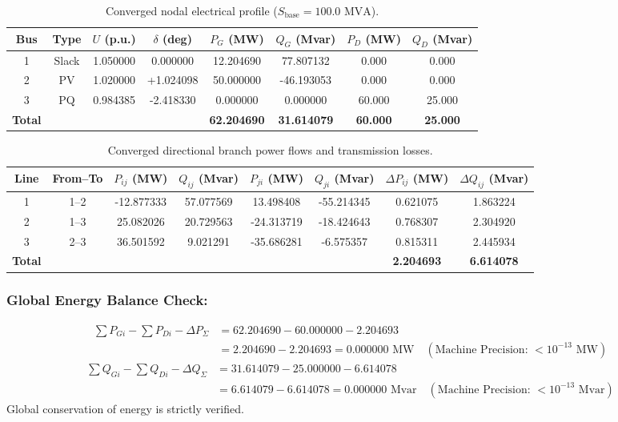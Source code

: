 \documentclass[12pt,a4paper,oneside]{report}
\begin{document}
\begin{table}[H]
\centering
\caption{Converged nodal electrical profile ($S_{\text{base}} = 100.0\text{ MVA}$).}
\label{tab:converged_bus}
\begin{tabular}{cccccccc}
\toprule
\textbf{Bus} & \textbf{Type} & \textbf{$U$ (p.u.)} & \textbf{$\delta$ (deg)} & \textbf{$P_G$ (MW)} & \textbf{$Q_G$ (Mvar)} & \textbf{$P_D$ (MW)} & \textbf{$Q_D$ (Mvar)} \\
\midrule
1 & Slack & 1.050000 & 0.000000 & 12.204690 & 77.807132 & 0.000 & 0.000 \\
2 & PV & 1.020000 & +1.024098 & 50.000000 & -46.193053 & 0.000 & 0.000 \\
3 & PQ & 0.984385 & -2.418330 & 0.000000 & 0.000000 & 60.000 & 25.000 \\
\midrule
\textbf{Total} & & & & \textbf{62.204690} & \textbf{31.614079} & \textbf{60.000} & \textbf{25.000} \\
\bottomrule
\end{tabular}
\end{table}

\begin{table}[H]
\centering
\caption{Converged directional branch power flows and transmission losses.}
\label{tab:converged_branch}
\begin{tabular}{cccccccc}
\toprule
\textbf{Line} & \textbf{From--To} & \textbf{$P_{ij}$ (MW)} & \textbf{$Q_{ij}$ (Mvar)} & \textbf{$P_{ji}$ (MW)} & \textbf{$Q_{ji}$ (Mvar)} & \textbf{$\Delta P_{ij}$ (MW)} & \textbf{$\Delta Q_{ij}$ (Mvar)} \\
\midrule
1 & 1--2 & -12.877333 & 57.077569 & 13.498408 & -55.214345 & 0.621075 & 1.863224 \\
2 & 1--3 & 25.082026 & 20.729563 & -24.313719 & -18.424643 & 0.768307 & 2.304920 \\
3 & 2--3 & 36.501592 & 9.021291 & -35.686281 & -6.575357 & 0.815311 & 2.445934 \\
\midrule
\textbf{Total} & & & & & & \textbf{2.204693} & \textbf{6.614078} \\
\bottomrule
\end{tabular}
\end{table}

\subsubsection{Global Energy Balance Check:}
\begin{align}
\sum P_{Gi} - \sum P_{Di} - \Delta P_{\Sigma} &= 62.204690 - 60.000000 - 2.204693 \nonumber \\
&= 2.204690 - 2.204693 = 0.000000\text{ MW} \quad (\text{Machine Precision: } < 10^{-13}\text{ MW})
\end{align}
\begin{align}
\sum Q_{Gi} - \sum Q_{Di} - \Delta Q_{\Sigma} &= 31.614079 - 25.000000 - 6.614078 \nonumber \\
&= 6.614079 - 6.614078 = 0.000000\text{ Mvar} \quad (\text{Machine Precision: } < 10^{-13}\text{ Mvar})
\end{align}
Global conservation of energy is strictly verified.
\end{document}
